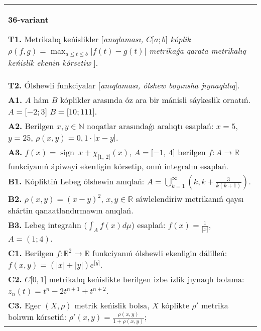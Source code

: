 \documentclass{article}
\DeclareMathOperator{\sign}{sign}
\begin{document}
\begin{tabular}{m{17cm}}
\textbf{36-variant}
\newline

\textbf{T1.} Metrikalıq keńislikler [\textit{anıqlaması, \(C\lbrack a;b\rbrack\) kóplik \(\rho(f,g) = \max_{a \leq t \leq b}\left| f(t) - g(t) \right|\) metrikaǵa qarata metrikalıq keńislik ekenin kórsetiw }]. \\
\textbf{T2.} Ólshewli funkciyalar [\textit{anıqlaması, ólshew boyınsha jıynaqlılıq}]. \\
\textbf{A1.} \(A\) hám \(B\) kóplikler arasında óz ara bir mánisli sáykeslik ornatıń. \(A = \lbrack - 2;3\rbrack\) \(B = \lbrack 10;111\rbrack\). \\
\textbf{A2.} Berilgen \(x,y\mathbb{\in N}\) noqatlar arasındaǵı aralıqtı esaplań: \(x = 5\), \(y = 25\), \(\rho(x,y) = 0,1 \cdot |x - y|\). \\
\textbf{A3.} \(f(x) = \sign \ x + \chi_{\lbrack 1,\ 2\rbrack}(x)\), \(A = \lbrack - 1,\ 4\rbrack\) berilgen \(f:A\rightarrow\mathbb{R}\) funkciyanıń ápiwayi ekenligin kórsetip, onıń integralın esaplań. \\
\textbf{B1.} Kópliktiń Lebeg ólshewin anıqlań: \(A = \bigcup_{k = 1}^{\infty}\left( k,k + \frac{3}{k(k + 1)} \right)\). \\
\textbf{B2.} \(\rho(x,y) = (x - y)^{2}\), \(x,y\mathbb{\in R}\) sáwlelendiriw metrikanıń qaysı shártin qanaatlandırmawın anıqlań. \\
\textbf{B3.} Lebeg integralın (\(\int_{A}^{}{f(x)d\mu}\)) esaplań: \(f(x) = \frac{1}{\lbrack x\rbrack}\), \(A = (1;4)\). \\
\textbf{C1.} Berilgen \(f:\mathbb{R}^{2}\mathbb{\rightarrow R}\) funkciyanıń ólshewli ekenligin dálilleń: \(f(x,y) = \left( |x| + |y| \right)e^{\lbrack y\rbrack}\). \\
\textbf{C2.} \(C\lbrack 0,1\rbrack\) metrikalıq keńislikte berilgen izbe izlik jıynaqlı bolama: \(z_{n}(t) = t^{n} - 2t^{n + 1} + t^{n + 2}\). \\
\textbf{C3.} Eger \((X,\rho)\) metrik keńislik bolsa, \(X\) kóplikte \(\rho'\) metrika bolıwın kórsetiń: \(\rho'(x,y) = \frac{\rho(x,y)}{1 + \rho(x,y)}\); \\

\end{tabular}
\vspace{1cm}
\end{document}
